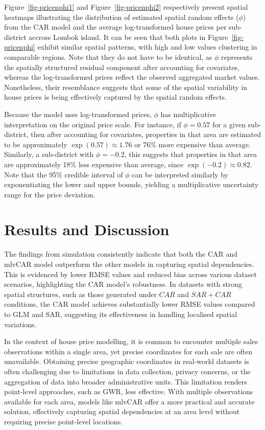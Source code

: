 \documentclass[
  default,
]{sn-jnl}
\begin{document}
Figure~\ref{fig-pricenphi1} and Figure~\ref{fig-pricenphi2} respectively
present spatial heatmaps illustrating the distribution of estimated
spatial random effects (\(\phi\)) from the CAR model and the average
log-transformed house prices per sub-district accross Lombok island. It
can be seen that both plots in Figure~\ref{fig-pricenphi} exhibit
similar spatial patterns, with high and low values clustering in
comparable regions. Note that they do not have to be identical, as
\(\phi\) represents the spatially structured residual component after
accounting for covariates, whereas the log-transformed prices reflect
the observed aggregated market values. Nonetheless, their resemblance
suggests that some of the spatial variability in house prices is being
effectively captured by the spatial random effects.

Because the model uses log-transformed prices, \(\phi\) has
multiplicative interpretation on the original price scale. For instance,
if \(\phi = 0.57\) for a given sub-district, then after accounting for
covariates, properties in that area are estimated to be approximately
\(\exp(0.57) \approx 1.76\) or 76\% more expensive than average.
Similarly, a sub-district with \(\phi = -0.2\), this suggests that
properties in that area are approximately 18\% less expensive than
average, since \(\exp(-0.2) \approx 0.82\). Note that the 95\% credible
interval of \(\phi\) can be interpreted similarly by exponentiating the
lower and upper bounds, yielding a multiplicative uncertainty range for
the price deviation.

\section{Results and Discussion}\label{results-and-discussion}

The findings from simulation consistently indicate that both the CAR and
mlvCAR model outperform the other models in capturing spatial
dependencies. This is evidenced by lower RMSE values and reduced bias
across various dataset scenarios, highlighting the CAR model's
robustness. In datasets with strong spatial structures, such as those
generated under \(CAR\) and \(SAR + CAR\) conditions, the CAR model
achieves substantially lower RMSE values compared to GLM and SAR,
suggesting its effectiveness in handling localised spatial variations.

In the context of house price modelling, it is common to encounter
multiple sales observations within a single area, yet precise
coordinates for each sale are often unavailable. Obtaining precise
geographic coordinates in real-world datasets is often challenging due
to limitations in data collection, privacy concerns, or the aggregation
of data into broader administrative units. This limitation renders
point-level approaches, such as GWR, less effective. With multiple
observations available for each area, models like mlvCAR offer a more
practical and accurate solution, effectively capturing spatial
dependencies at an area level without requiring precise point-level
locations.
\end{document}
